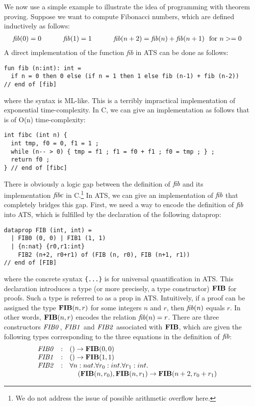 \documentclass{llncs}
\begin{document}
We now use a simple example to illustrate the idea of programming with
theorem proving. Suppose we want to compute Fibonacci numbers, which are
defined inductively as follows:
\[\begin{array}{ccccc}
{\it fib}(0) = 0 &\kern12pt& {\it fib}(1) = 1 &\kern12pt& {\it fib}(n+2) = {\it fib}(n) + {\it fib}(n+1)~~\mbox{for $n>=0$} \\
\end{array}\]
A direct implementation of the function {\it fib} in ATS can be done as
follows:
\begin{verbatim}
fun fib (n:int): int =
  if n = 0 then 0 else (if n = 1 then 1 else fib (n-1) + fib (n-2))
// end of [fib]
\end{verbatim}
where the syntax is ML-like. This is a terribly impractical implementation
of exponential time-complexity.  In C, we can give an implementation as
follows that is of O(n) time-complexity:
\begin{verbatim}
int fibc (int n) {
  int tmp, f0 = 0, f1 = 1 ;
  while (n-- > 0) { tmp = f1 ; f1 = f0 + f1 ; f0 = tmp ; } ;
  return f0 ;
} // end of [fibc]
\end{verbatim}
There is obviously a logic gap between the definition of ${\it fib}$ and its
implementation ${\it fibc}$ in C.\footnote{We do not address the issue of
  possible arithmetic overflow here.} In ATS, we can give an implementation
of ${\it fib}$ that completely bridges this gap. First, we need a way to encode
the definition of ${\it fib}$ into ATS, which is fulfilled by the declaration of
the following dataprop:
\begin{verbatim}
dataprop FIB (int, int) =
  | FIB0 (0, 0) | FIB1 (1, 1)
  | {n:nat} {r0,r1:int}
    FIB2 (n+2, r0+r1) of (FIB (n, r0), FIB (n+1, r1))
// end of [FIB]
\end{verbatim}
where the concrete syntax \verb`{...}` is for universal quantification in
ATS. This declaration introduces a type (or more precisely, a type
constructor) ${\bf FIB}$ for proofs. Such a type is referred to as a prop in
ATS. Intuitively, if a proof can be assigned the type ${\bf FIB}(n,r)$ for some
integers $n$ and $r$, then ${\it fib}(n)$ equals $r$.  In other words,
${\bf FIB}(n,r)$ encodes the relation ${\it fib}(n)=r$. There are three constructors
${\it FIB0}$, ${\it FIB1}$ and ${\it FIB2}$ associated with ${\bf FIB}$, which are given
the following types corresponding to the three equations in the definition
of ${\it fib}$:
\[\begin{array}{rcl}
{\it FIB0} & : & () \rightarrow {\bf FIB} (0, 0) \\
{\it FIB1} & : & () \rightarrow {\bf FIB} (1, 1) \\
{\it FIB2} & : & \forall n:nat.\forall r_0:int.\forall r_1:int. \\
        &   & \kern12pt ({\bf FIB} (n, r_0), {\bf FIB} (n, r_1) \rightarrow {\bf FIB} (n+2, r_0+r_1) \\
\end{array}\]
\end{document}
